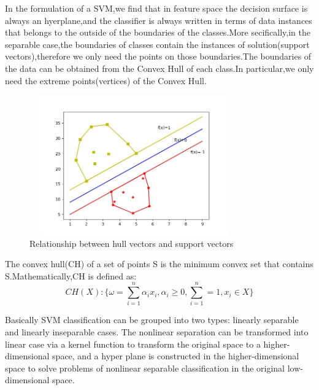 \documentclass[a4paper]{article}
\begin{document}
  
In the formulation of a SVM,we find that in feature space the decision surface is always an hyerplane,and the classifier is always written in terms of data instances that belongs to the outside of the boundaries of the classes.More secifically,in the separable case,the boundaries of classes contain the instances of solution(support vectors),therefore we only need the points on those boundaries.The boundaries of the data can be obtained from the Convex Hull of each class.In particular,we only need the extreme points(vertices) of the Convex Hull.





\begin{figure}[h]
  \centering
  \includegraphics[width=9cm,height=6cm]{HullVector_SupportVector}
  \caption{Relationship between hull vectors and support vectors}
\end{figure}

The convex hull(CH) of a set of points S is the minimum convex set that contains S.Mathematically,CH is defined as:
$$
CH(X) :\{ \omega = \sum_{i=1} ^{n} \alpha_i x_i, \alpha_i \geq 0, \sum_{i=1} ^{n} = 1, x_i \in X \}
$$

Basically SVM classification can be grouped into two types: linearly separable and linearly inseparable cases. The nonlinear separation can be transformed into linear case via a kernel function to transform the original space to a higher-dimensional space, and a hyper plane is constructed in the higher-dimensional space to solve problems of nonlinear separable classification in the original low-dimensional space.
\end{document}
